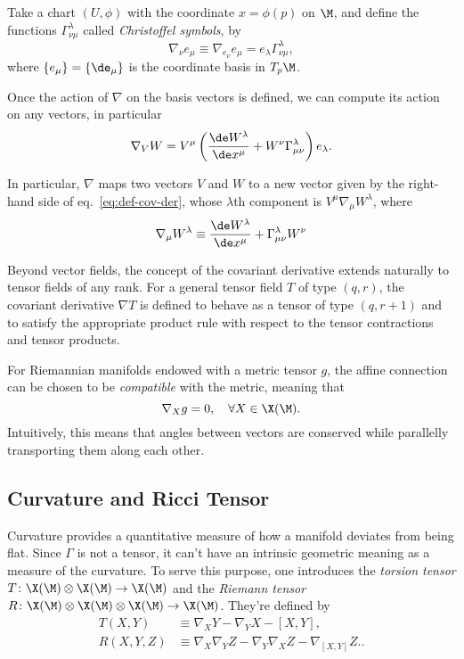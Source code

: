 Take a chart $(U, \phi)$ with the coordinate $x = \phi(p)$ on $\M$, and define the functions $\Gamma^\lambda_{\nu\mu}$ called \emph{Christoffel symbols}, by
\begin{equation}
    \nabla_\nu e_\mu \equiv \nabla_{e_\nu} e_\mu = e_\lambda \Gamma^\lambda_{\nu\mu},
\end{equation}
where $\{e_\mu\} = \{\de_\mu\}$ is the coordinate basis in $T_p \M$.

Once the action of $\nabla$ on the basis vectors is defined, we can compute its action on any vectors, in particular
\begin{equation}\label{eq:def-cov-der}
    \nabla_V W = V^\mu \left( \frac{\de W^\lambda}{\de x^\mu} + W^\nu \Gamma^\lambda_{\mu\nu} \right) e_\lambda .
\end{equation}

In particular, $\nabla$ maps two vectors $V$ and $W$ to a new vector given by the right-hand side of eq.~\eqref{eq:def-cov-der}, whose $\lambda$th component is $V^\mu \nabla_\mu W^\lambda$, where
\begin{equation}
    \nabla_\mu W^\lambda \equiv \frac{\de W^\lambda}{\de x^\mu} + \Gamma^\lambda_{\mu\nu} W^\nu
\end{equation}

Beyond vector fields, the concept of the covariant derivative extends naturally to tensor fields of any rank. For a general tensor field $T$ of type $(q, r)$, the covariant derivative $\nabla T$ is defined to behave as a tensor of type $(q, r+1)$ and to satisfy the appropriate product rule with respect to the tensor contractions and tensor products.

For Riemannian manifolds endowed with a metric tensor $g$, the affine connection can be chosen to be \emph{compatible} with the metric, meaning that
\begin{equation}
    \nabla_X g = 0, \quad \forall X \in \X(\M).
\end{equation}
Intuitively, this means that angles between vectors are conserved while parallelly transporting them along each other.

\subsection{Curvature and Ricci Tensor}

Curvature provides a quantitative measure of how a manifold deviates from being flat. Since $\Gamma$ is not a tensor, it can't have an intrinsic geometric meaning as a measure of the curvature. To serve this purpose, one introduces the \emph{torsion tensor} $T \colon \X(\M) \otimes \X(\M) \to \X(\M) $ and the \emph{Riemann tensor} $R \colon \X(\M) \otimes \X(\M) \otimes \X(\M) \to \X(\M) $. They're defined by
\begin{align}
    T(X, Y) &\equiv \nabla_X Y - \nabla_Y X - [X,Y], \\
    R(X,Y,Z) &\equiv \nabla_X \nabla_Y Z - \nabla_Y \nabla_X Z - \nabla_{[X,Y]} Z. \label{eq:def-riemann}.
\end{align}

